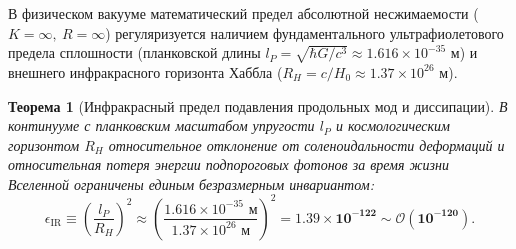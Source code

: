 \documentclass[12pt,a4paper]{article}
\newtheorem{theorem}{Теорема}
\begin{document}
	В физическом вакууме математический предел абсолютной несжимаемости ($K = \infty, \ R = \infty$) регуляризуется наличием фундаментального ультрафиолетового предела сплошности (планковской длины $l_P = \sqrt{\hbar G / c^3} \approx 1.616 \times 10^{-35}$ м) и внешнего инфракрасного горизонта Хаббла ($R_H = c / H_0 \approx 1.37 \times 10^{26}$ м).
	
	\begin{theorem}[Инфракрасный предел подавления продольных мод и диссипации]
		В континууме с планковским масштабом упругости $l_P$ и космологическим горизонтом $R_H$ относительное отклонение от соленоидальности деформаций и относительная потеря энергии подпороговых фотонов за время жизни Вселенной ограничены единым безразмерным инвариантом:
		\begin{equation}
			\epsilon_{\mathrm{IR}} \equiv \left( \frac{l_P}{R_H} \right)^2 \approx \left( \frac{1.616 \times 10^{-35} \text{ м}}{1.37 \times 10^{26} \text{ м}} \right)^2 = \mathbf{1.39 \times 10^{-122} \sim \mathcal{O}(10^{-120})}.
		\end{equation}
	\end{theorem}
	
\end{document}
